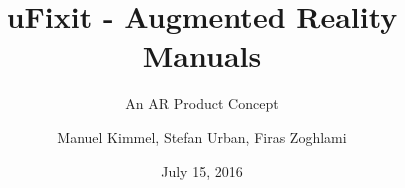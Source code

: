 \documentclass[doctype=Studienarbeit,oneside]{ldvbook}
\begin{document}
\subject{Advanced Seminar}
\title{uFixit - Augmented Reality Manuals}
\subtitle{An AR Product Concept}
\author{Manuel Kimmel, Stefan Urban, Firas Zoghlami}
\date{July 15, 2016}

\maketitle


\tableofcontents








%
\end{document}

